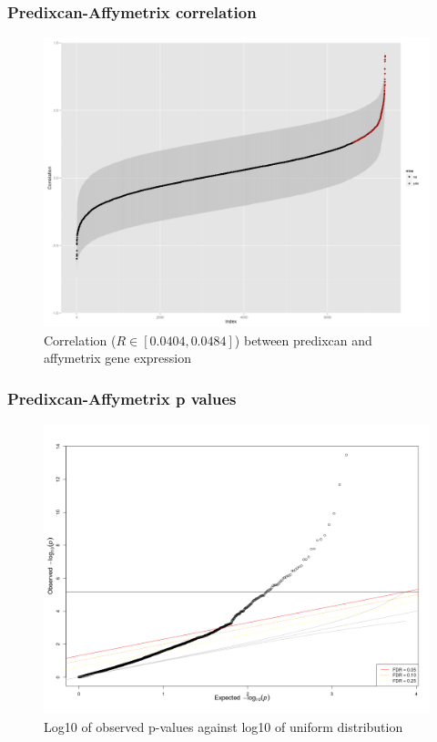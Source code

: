 \documentclass{beamer}
\begin{document}
  \begin{frame}
    \frametitle{Predixcan-Affymetrix correlation}
    \begin{center}
      \begin{figure}
      \includegraphics[scale=0.2]{../Out/predi_affy_by_gene.png}
      \caption{Correlation ($R \in [0.0404,0.0484]$) between predixcan and affymetrix gene expression}
      \end{figure}
    \end{center}
  \end{frame}
  
    \begin{frame}
    \frametitle{Predixcan-Affymetrix p values}
    \begin{center}
      \begin{figure}
      \includegraphics[scale=0.2]{../Out/qqunif_predixcan_affymetrix.png}
      \caption{Log10 of observed p-values against log10 of uniform distribution}
      \end{figure}
    \end{center}
  \end{frame}
  
\end{document}
